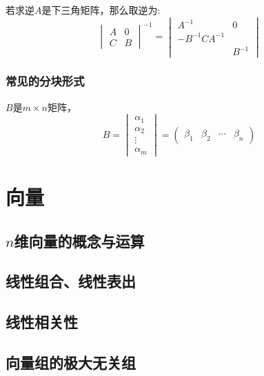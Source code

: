 \documentclass[lang=cn,10pt]{elegantbook}
\begin{document}
若求逆$A$是下三角矩阵，那么取逆为:
\begin{equation}
    \begin{vmatrix}
        A & 0\\
        C & B
    \end{vmatrix}^{-1}
    = \begin{vmatrix}
         A^{-1} & 0\\
        -B^{-1}CA^{-1}\\ & B^{-1}
    \end{vmatrix}
\end{equation}

\subsection{常见的分块形式}
\begin{definition}
    $B$是$m \times n$矩阵，
    \begin{equation}
        B = \begin{vmatrix}
            \alpha_1\\
            \alpha_2\\
            \vdots\\
            \alpha_m
        \end{vmatrix}=
        \begin{pmatrix}
            \beta_1&\beta_2&\cdots&\beta_n
        \end{pmatrix}
    \end{equation}
    
\end{definition}


\chapter{向量}
\section{$n$维向量的概念与运算}
\section{线性组合、线性表出}
\section{线性相关性}
\section{向量组的极大无关组}
\end{document}
